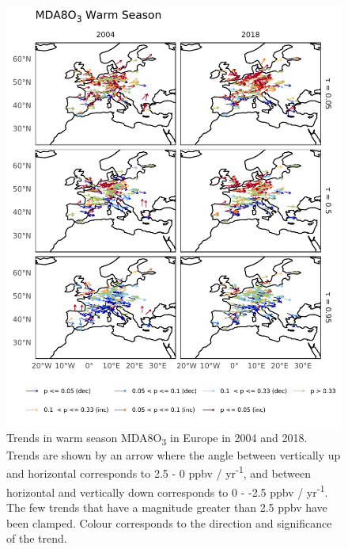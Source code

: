 \documentclass[journal abbreviation, manuscript]{copernicus}
\begin{document}
\begin{figure}[p]
\centering
\includegraphics[height=0.9\textheight]{figures/paper_figures/f05_o3_map_mda8_warm_eu_o3.pdf}
\caption{Trends in warm season MDA8O\textsubscript{3} in Europe in 2004 and 2018. Trends are shown by an arrow where the angle between vertically up and horizontal corresponds to 2.5 - 0 ppbv / yr\textsuperscript{-1}, and between horizontal and vertically down corresponds to 0 - -2.5 ppbv / yr\textsuperscript{-1}. The few trends that have a magnitude greater than 2.5 ppbv have been clamped. Colour corresponds to the direction and significance of the trend.}
\label{fig:o3_map_eu_mda8_warm}
\end{figure}
\clearpage
\end{document}
